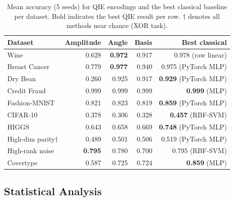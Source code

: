 \documentclass[12pt]{article}
\begin{document}
\begin{table}[tbp]
\centering
\caption{Mean accuracy (5 seeds) for QIE encodings and the best classical
baseline per dataset.  Bold indicates the best QIE result per row.
$\dagger$ denotes all methods near chance (XOR task).}
\label{tab:accuracy}
\small
\begin{tabular}{lrrrr}
\toprule
Dataset & Amplitude & Angle & Basis & Best classical \\
\midrule
Wine                     & 0.628 & \textbf{0.972} & 0.917 & 0.978 (raw linear) \\
Breast Cancer            & 0.779 & \textbf{0.977} & 0.940 & 0.975 (PyTorch MLP) \\
Dry Bean                 & 0.260 & 0.925          & 0.917 & \textbf{0.929} (PyTorch MLP) \\
Credit Fraud             & 0.999 & 0.999          & 0.999 & \textbf{0.999} (MLP) \\
Fashion-MNIST            & 0.821 & 0.823          & 0.819 & \textbf{0.859} (PyTorch MLP) \\
CIFAR-10                 & 0.378 & 0.306          & 0.328 & \textbf{0.457} (RBF-SVM) \\
HIGGS                    & 0.643 & 0.658          & 0.669 & \textbf{0.748} (PyTorch MLP) \\
High-dim parity$\dagger$ & 0.489 & 0.501          & 0.506 & 0.519 (PyTorch MLP) \\
High-rank noise          & \textbf{0.795} & 0.780  & 0.700 & 0.795 (RBF-SVM) \\
Covertype                & 0.587 & 0.725          & 0.724 & \textbf{0.859} (MLP) \\
\bottomrule
\end{tabular}
\end{table}

\subsection{Statistical Analysis}
\label{sec:stats}
\end{document}
